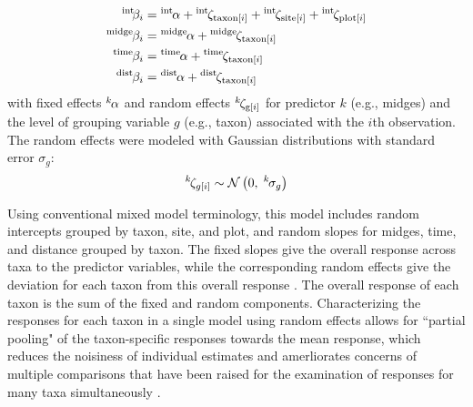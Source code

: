 \begin{equation} \label{eq:betas}
\begin{split}
    {}^\text{int}\hspace*{-2pt}\beta_i &= {}^\text{int}\hspace*{-1pt}\alpha +
        {}^\text{int}\hspace*{-1pt}\zeta_{\text{taxon}[i]} +
        {}^\text{int}\hspace*{-1pt}\zeta_{\text{site}[i]} +
        {}^\text{int}\hspace*{-1pt}\zeta_{\text{plot}[i]} \\
    {}^\text{midge}\hspace*{-1pt}\beta_i &= {}^\text{midge}\hspace*{-1pt}\alpha +
            {}^\text{midge}\hspace*{-1pt}\zeta_{\text{taxon}[i]} \\
    {}^\text{time}\hspace*{-1pt}\beta_i &= {}^\text{time}\hspace*{-1pt}\alpha +
            {}^\text{time}\hspace*{-1pt}\zeta_{\text{taxon}[i]} \\
    {}^\text{dist}\hspace*{-1pt}\beta_i &= {}^\text{dist}\hspace*{-1pt}\alpha +
            {}^\text{dist}\hspace*{-1pt}\zeta_{\text{taxon}[i]}
\end{split}
\end{equation}
%
\noindent with fixed effects ${}^k\hspace*{-1pt}\alpha$ and random effects
${}^k\hspace*{-1pt}\zeta_{\text{g}[i]}$ for predictor $k$ (e.g., midges)
and the level of grouping variable $g$ (e.g., taxon) associated  with the $i$th observation.
The random effects were modeled with Gaussian distributions with
standard error $\sigma_g$:
%
\begin{equation} \label{eq:zetas}
    {}^k\hspace*{-1pt}\zeta_{g[i]} \sim
        \mathcal{N}\left(0, \; {}^k\hspace*{-1pt}\sigma_g \right)
\end{equation}

Using conventional mixed model terminology, this model includes random intercepts
grouped by taxon, site, and plot, and random slopes for midges,
time, and distance grouped by taxon.
The fixed slopes give the overall response across taxa to the predictor variables,
while the corresponding random effects give the deviation for each taxon from
this overall response \citep{Jackson2012}.
The overall response of each taxon is the sum of the fixed and random components.
Characterizing the responses for each taxon in a single model using random effects
allows for ``partial pooling" of the taxon-specific responses towards the mean response,
which reduces the noisiness of individual estimates and amerliorates concerns of
multiple comparisons \citep{Gelman2012} that have been raised
for the examination of responses for many taxa simultaneously \citep{Mcgarigal2013}.

